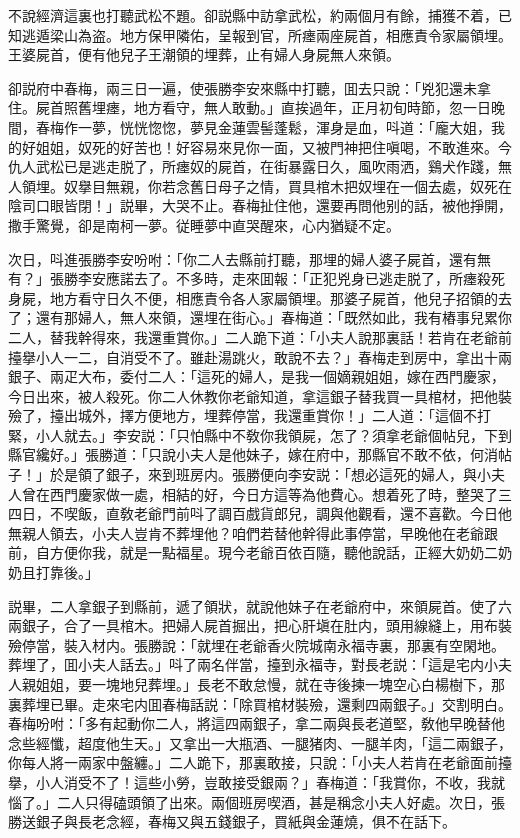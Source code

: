 不說經濟這裏也打聽武松不題。卻説縣中訪拿武松，約兩個月有餘，捕獲不着，已知逃遁梁山為盗。地方保甲隣佑，呈報到官，所瘗兩座屍首，相應責令家屬領埋。王婆屍首，便有他兒子王潮領的埋葬，止有婦人身屍無人來領。

卻説府中春梅，兩三日一遍，使張勝李安來縣中打聽，囬去只說：「兇犯還未拿住。屍首照舊埋瘗，地方看守，無人敢動。」直挨過年，正月初旬時節，忽一日晚間，春梅作一夢，恍恍惚惚，夢見金蓮雲髻蓬鬆，渾身是血，呌道：「龐大姐，我的好姐姐，奴死的好苦也！好容易來見你一面，又被門神把住嗔喝，不敢進來。今仇人武松已是逃走脱了，所瘗奴的屍首，在街暴露日久，風吹雨洒，鷄犬作踐，無人領埋。奴擧目無親，你若念舊日母子之情，買具棺木把奴埋在一個去處，奴死在陰司口眼皆閉！」説畢，大哭不止。春梅扯住他，還要再問他别的話，被他掙開，撒手驚覺，卻是南柯一夢。従睡夢中直哭醒來，心内猶疑不定。

次日，呌進張勝李安吩咐：「你二人去縣前打聽，那埋的婦人婆子屍首，還有無有？」張勝李安應諾去了。不多時，走來囬報：「正犯兇身已逃走脱了，所瘗殺死身屍，地方看守日久不便，相應責令各人家屬領埋。那婆子屍首，他兒子招領的去了；還有那婦人，無人來領，還埋在街心。」春梅道：「既然如此，我有樁事兒累你二人，替我幹得來，我還重賞你。」二人跪下道：「小夫人說那裏話！若肯在老爺前擡擧小人一二，自消受不了。雖赴湯跳火，敢說不去？」春梅走到房中，拿出十兩銀子、兩疋大布，委付二人：「這死的婦人，是我一個嫡親姐姐，嫁在西門慶家，今日出來，被人殺死。你二人休教你老爺知道，拿這銀子替我買一具棺材，把他裝殮了，擡出城外，擇方便地方，埋葬停當，我還重賞你！」二人道：「這個不打緊，小人就去。」李安説：「只怕縣中不敎你我領屍，怎了？須拿老爺個帖兒，下到縣官纔好。」張勝道：「只說小夫人是他妹子，嫁在府中，那縣官不敢不依，何消帖子！」於是領了銀子，來到班房内。張勝便向李安説：「想必這死的婦人，與小夫人曾在西門慶家做一處，相結的好，今日方這等為他費心。想着死了時，整哭了三四日，不喫飯，直敎老爺門前呌了調百戲貨郎兒，調與他觀看，還不喜歡。今日他無親人領去，小夫人豈肯不葬埋他？咱們若替他幹得此事停當，早晚他在老爺跟前，自方便你我，就是一點福星。現今老爺百依百隨，聽他說話，正經大奶奶二奶奶且打靠後。」

説畢，二人拿銀子到縣前，遞了領狀，就說他妹子在老爺府中，來領屍首。使了六兩銀子，合了一具棺木。把婦人屍首掘出，把心肝塡在肚内，頭用線縫上，用布裝殮停當，裝入材内。張勝說：「就埋在老爺香火院城南永福寺裏，那裏有空閑地。葬埋了，囬小夫人話去。」呌了兩名伴當，擡到永福寺，對長老説：「這是宅内小夫人親姐姐，要一塊地兒葬埋。」長老不敢怠慢，就在寺後揀一塊空心白楊樹下，那裏葬埋已畢。走來宅内囬春梅話説：「除買棺材裝殮，還剩四兩銀子。」交割明白。春梅吩咐：「多有起動你二人，將這四兩銀子，拿二兩與長老道堅，敎他早晚替他念些經懺，超度他生天。」又拿出一大瓶酒、一腿猪肉、一腿羊肉，「這二兩銀子，你每人將一兩家中盤纏。」二人跪下，那裏敢接，只說：「小夫人若肯在老爺面前擡擧，小人消受不了！這些小勞，豈敢接受銀兩？」春梅道：「我賞你，不收，我就惱了。」二人只得磕頭領了出來。兩個班房喫酒，甚是稱念小夫人好處。次日，張勝送銀子與長老念經，春梅又與五錢銀子，買紙與金蓮燒，俱不在話下。

